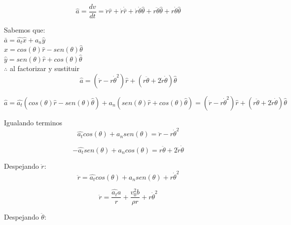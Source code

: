 \documentclass[a4paper,11pt]{scrartcl}
\begin{document}
\begin{center}
\begin{equation}
  \hat{a} = \frac{dv}{dt} = \ddot{r}\hat{r} + \dot{r}\dot{\hat{r}} + \dot{r}\dot{\theta}\hat{\theta} + r\ddot{\theta}\hat{\theta} + r\dot{\theta}\hat{\theta}
\end{equation}

Sabemos que:\\
$\bar{a} = \hat{a_t}\hat{x} + a_n\hat{y}$\\
$\hat{x} = cos(\theta)\hat{r} - sen(\theta)\hat{\theta}$\\
$\hat{y} = sen(\theta)\hat{r} + cos(\theta)\hat{\theta}$\\
$\therefore$ al factorizar y sustituir\\

\begin{equation}
  \hat{a} = (\ddot{r} - r\dot{\theta}^{2})\hat{r} + (r\ddot{\theta} + 2\dot{r}\dot{\theta})\hat{\theta}
\end{equation}

\begin{equation}
  \hat{a} = \hat{a_t}(cos(\theta)\hat{r} - sen(\theta)\hat{\theta}) + a_n(sen(\theta)\hat{r} + cos(\theta)\hat{\theta}) = (\ddot{r} - r\dot{\theta}^{2})\hat{r} + (r\ddot{\theta} + 2\dot{r}\dot{\theta})\hat{\theta}
\end{equation}

Igualando terminos\\

\begin{equation}
  \hat{a_t}cos(\theta) + a_n sen(\theta) = \ddot{r} - r\dot{\theta}^{2}
\end{equation}

\begin{equation}
  -\hat{a_t}sen(\theta) + a_n cos(\theta) = r\ddot{\theta} + 2\dot{r}\dot{\theta}
\end{equation}

Despejando $\ddot{r}$:\\

\begin{equation}
  \ddot{r} = \hat{a_t}cos(\theta) + a_n sen(\theta) + r\dot{\theta}^{2}
\end{equation}

\begin{equation}
  \ddot{r} = \frac{\hat{a_t} a}{r} + \frac{v_0^{2}b}{\rho r} + r\dot{\theta}^{2}
\end{equation}

Despejando $\ddot{\theta}$:\\


\end{center}
\end{document}
